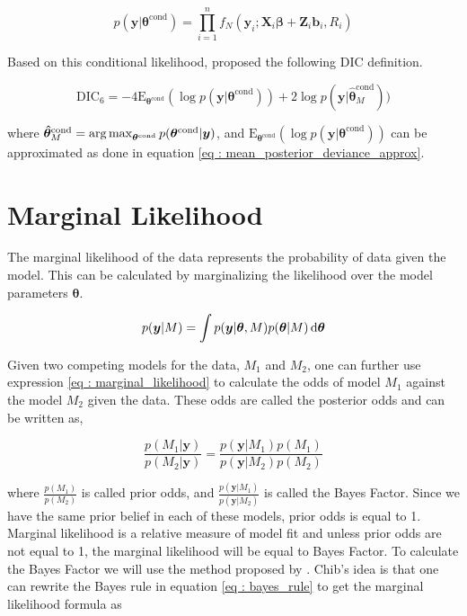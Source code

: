\begin{equation}
\label{eq : conditional_data_likelihood}
p(\boldsymbol{y}|\boldsymbol{\theta}^\text{cond}) = \prod_{i=1}^n f_N(\boldsymbol{y}_i; \boldsymbol{X}_i\boldsymbol{\beta} + \boldsymbol{Z}_i \boldsymbol{b}_i, R_i)
\end{equation}

Based on this conditional likelihood, \citet{celeux_deviance_2006} proposed the following DIC definition.

\begin{equation}
\label{eq : DIC6}
\text{DIC}_6 = -4\text{E}_{\boldsymbol{\theta}^\text{cond}} (\log{p(\boldsymbol{y}|\boldsymbol{\theta}^\text{cond})}) + 2\log{p(\boldsymbol{y}|\boldsymbol{\hat{\theta}}^\text{cond}_M)})
\end{equation}

where
$\boldsymbol{\hat{\theta}}^\text{cond}_M = \operatorname*{arg\,max}_{\boldsymbol{\theta}^\text{cond}}p(\boldsymbol{\theta}^\text{cond}|\boldsymbol{y})$, and $\text{E}_{\boldsymbol{\theta}^\text{cond}} (\log{p(\boldsymbol{y}|\boldsymbol{\theta}^\text{cond})})$ can be approximated as done in equation \ref{eq : mean_posterior_deviance_approx}.

\section{Marginal Likelihood}
\label{sec : marginal_likelihood}

The marginal likelihood of the data represents the probability of data given the model. This can be calculated by marginalizing the likelihood over the model parameters $\boldsymbol{\theta}$. 

\begin{equation}
\label{eq : marginal_likelihood}
p(\boldsymbol{y}|M) = \int p(\boldsymbol{y}|\boldsymbol{\theta}, M) p(\boldsymbol{\theta}|M) \mathop{}\!\mathrm{d} \boldsymbol{\theta}
\end{equation}

Given two competing models for the data, $M_1$ and $M_2$, one can further use expression \ref{eq : marginal_likelihood} to calculate the odds of model $M_1$ against the model $M_2$ given the data. These odds are called the posterior odds and can be written as,

$$\frac {p(M_1|\boldsymbol{y})}{p(M_2|\boldsymbol{y})} = \frac {p(\boldsymbol{y}|M_1) p(M_1)} {p(\boldsymbol{y}|M_2) p(M_2)}$$

where $\frac {p(M_1)}{p(M_2)}$ is called prior odds, and $\frac {p(\boldsymbol{y}|M_1)} {p(\boldsymbol{y}|M_2)}$ is called the Bayes Factor. Since we have the same prior belief in each of these models, prior odds is equal to 1. Marginal likelihood is a relative measure of model fit and unless prior odds are not equal to 1, the marginal likelihood will be equal to Bayes Factor. To calculate the Bayes Factor we will use the method proposed by \citet{chib_marginal_1995}. Chib's idea is that one can rewrite the Bayes rule in equation \ref{eq : bayes_rule} to get the marginal likelihood formula as

